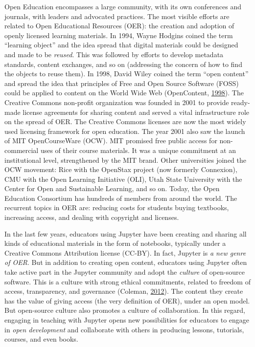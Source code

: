 \documentclass[]{book}
\begin{document}
Open Education encompasses a large community, with its own conferences
and journals, with leaders and advocated practices. The most visible
efforts are related to Open Educational Resources (OER): the creation
and adoption of openly licensed learning materials. In 1994, Wayne
Hodgins coined the term ``learning object'' and the idea spread that
digital materials could be designed and made to be \emph{reused}. This
was followed by efforts to develop metadata standards, content
exchanges, and so on (addressing the concern of how to find the objects
to reuse them). In 1998, David Wiley coined the term ``open content''
and spread the idea that principles of Free and Open Source Software
(FOSS) could be applied to content on the World Wide Web (OpenContent,
\protect\hyperlink{ref-OC1998}{1998}). The Creative Commons non-profit
organization was founded in 2001 to provide ready-made license
agreements for sharing content and served a vital infrastructure role on
the spread of OER. The Creative Commons licenses are now the most widely
used licensing framework for open education. The year 2001 also saw the
launch of MIT OpenCourseWare (OCW). MIT promised free public access for
non-commercial uses of their course materials. It was a unique
commitment at an institutional level, strengthened by the MIT brand.
Other universities joined the OCW movement: Rice with the OpenStax
project (now formerly Connexion), CMU with the Open Learning Initiative
(OLI), Utah State University with the Center for Open and Sustainable
Learning, and so on. Today, the Open Education Consortium has hundreds
of members from around the world. The recurrent topics in OER are:
reducing costs for students buying textbooks, increasing access, and
dealing with copyright and licenses.

In the last few years, educators using Jupyter have been creating and
sharing all kinds of educational materials in the form of notebooks,
typically under a Creative Commons Attribution license (CC-BY). In fact,
Jupyter is \emph{a new genre of OER}. But in addition to creating open
content, educators using Jupyter often take active part in the Jupyter
community and adopt the \emph{culture} of open-source software. This is
a culture with strong ethical commitments, related to freedom of access,
transparency, and governance (Coleman,
\protect\hyperlink{ref-coleman2012coding}{2012}). The content they
create has the value of giving access (the very definition of OER),
under an open model. But open-source culture also promotes a culture of
collaboration. In this regard, engaging in teaching with Jupyter opens
new possibilities for educators to engage in \emph{open development} and
collaborate with others in producing lessons, tutorials, courses, and
even books.
\end{document}

